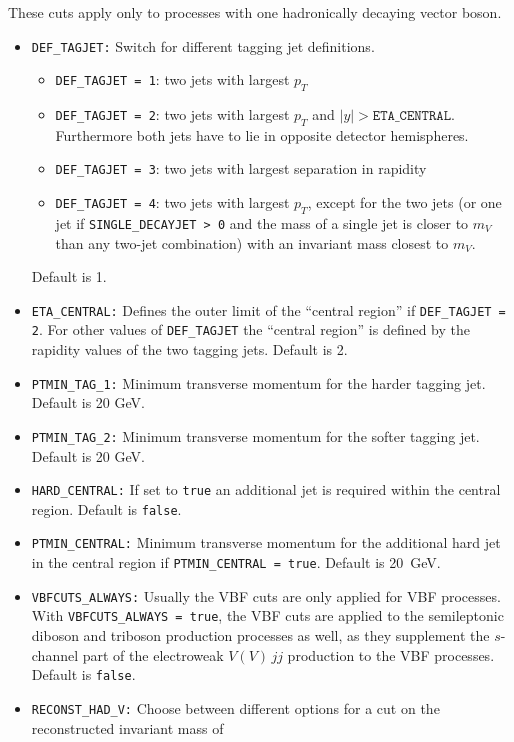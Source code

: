 \documentclass[english,12pt]{article}
\begin{document}
These cuts apply only to processes with one hadronically decaying vector boson.
\begin{itemize}
\item {\tt DEF\_TAGJET:} Switch for different tagging jet definitions.
\begin{itemize}
 \item {\tt DEF\_TAGJET = 1}: two jets with largest $p_T$
 \item {\tt DEF\_TAGJET = 2}: two jets with largest $p_T$ and $|y| > \texttt{ETA\_CENTRAL}$. Furthermore both jets
       have to lie in opposite detector hemispheres.
 \item {\tt DEF\_TAGJET = 3}: two jets with largest separation in rapidity
 \item {\tt DEF\_TAGJET = 4}: two jets with largest $p_T$, except for the two jets (or one jet if {\tt SINGLE\_DECAYJET > 0}
       and the mass of a single jet is closer to $m_V$ than any two-jet combination)
       with an invariant mass closest to $m_V$.
\end{itemize}
      Default is 1.
\item {\tt ETA\_CENTRAL:} Defines the outer limit of the ``central region'' if {\tt DEF\_TAGJET = 2}. For other values
      of {\tt DEF\_TAGJET} the ``central region'' is defined by the rapidity values of the two tagging jets.
      Default is 2.
\item {\tt PTMIN\_TAG\_1:} Minimum transverse momentum for the harder tagging jet. Default is 20 GeV.
\item {\tt PTMIN\_TAG\_2:} Minimum transverse momentum for the softer tagging jet. Default is 20 GeV.
\item {\tt HARD\_CENTRAL:} If set to {\tt true} an additional jet is required within the central region. Default is {\tt false}.
\item {\tt PTMIN\_CENTRAL:} Minimum transverse momentum for the additional hard jet in the central region if 
      {\tt PTMIN\_CENTRAL = true}. Default is 20~GeV. 
\item {\tt VBFCUTS\_ALWAYS:} Usually the VBF cuts are only applied for VBF processes.
      With {\tt VBFCUTS\_ALWAYS = true}, the VBF cuts are applied to the semileptonic 
      diboson and triboson production processes as well, as they supplement
      the $s$-channel part of the electroweak $V(V)\, jj$ production to the VBF processes.\\
      Default is {\tt false}.
\item {\tt RECONST\_HAD\_V:} Choose between different options for a cut on the reconstructed invariant mass of

\end{itemize}
\end{document}

